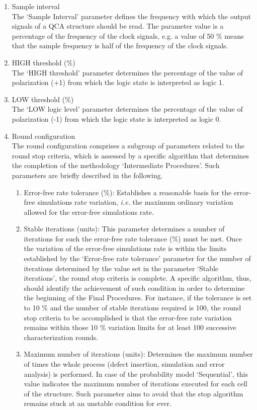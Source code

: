 \begin{enumerate}
\item Sample interval \\
\label{item_sample_interval}
The `Sample Interval' parameter defines the frequency with which the output signals of a QCA structure should be read. The parameter value is a percentage of the frequency of the clock signals, e.g. a value of 50 \% means that the sample frequency is half of the frequency of the clock signals.

\item HIGH threshold (\%) \\
The `HIGH threshold' parameter determines the percentage of the value of polarization (+1) from which the logic state is interpreted as logic 1.

\item LOW threshold (\%) \\
The `LOW logic level' parameter determines the percentage of the value of polarization (-1) from which the logic state is interpreted as logic 0.

\item Round configuration \\
The round configuration comprises a subgroup of parameters related to the round stop criteria, which is assessed by a specific algorithm that determines the completion of the methodology `Intermediate Procedures'. Such parameters are briefly described in the following.
\begin{enumerate}
    \item Error-free rate tolerance (\%): Establishes a reasonable basis for the error-free simulations rate variation, \textit{i.e.} the maximum ordinary variation allowed for the error-free simulations rate.
    \item Stable iterations (units): This parameter determines a number of iterations for such the error-free rate tolerance (\%) must be met. Once the variation of the error-free simulations rate is within the limits established by the `Error-free rate tolerance' parameter for the number of iterations determined by the value set in the parameter `Stable iterations', the round stop criteria is complete. A specific algorithm, thus, should identify the achievement of such condition in order to determine the beginning of the Final Procedures. For instance, if the tolerance is set to 10 \% and the number of stable iterations required is 100, the round stop criteria to be accomplished is that the error-free rate variation remains within those 10 \% variation limits for at least 100 successive characterization rounds.
	\item Maximum number of iterations (units): Determines the maximum number of times the whole process (defect insertion, simulation and error analysis) is performed. In case of the probability model `Sequential', this value indicates the maximum number of iterations executed for each cell of the structure. Such parameter aims to avoid that the stop algorithm remains stuck at an unstable condition for ever.
\end{enumerate}


\end{enumerate}
